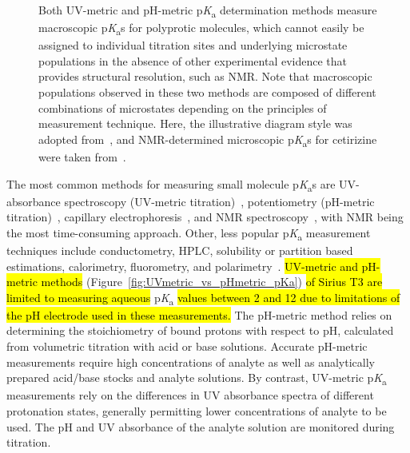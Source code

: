 \documentclass[9pt,lineno]{elife}
\newcommand{\pKa}{p\textit{K}\textsubscript{a}}
\begin{document}
\begin{figure}
\begin{center}
{Both UV-metric and pH-metric \pKa{} determination methods measure macroscopic \pKa{}s for polyprotic molecules, which cannot easily be assigned to individual titration sites and underlying microstate populations in the absence of other experimental evidence that provides structural resolution, such as NMR. 
Note that macroscopic populations observed in these two methods are composed of different combinations of microstates depending on the principles of measurement technique.
Here, the illustrative diagram style was adopted from~\citep{rupp_predicting_2011}, and NMR-determined microscopic \pKa{}s for cetirizine were taken from~\citep{marosi_triprotic_2009}. 
}
\label{fig:micro_vs_macro_pKa}
\end{center}
\end{figure}

The most common methods for measuring small molecule \pKa{}s are UV-absorbance spectroscopy (UV-metric titration)~\citep{tam_multi-wavelength_2001, allen_multiwavelength_1998,comer_ionization_2014}, potentiometry (pH-metric titration)~\citep{avdeef_ph-metric_1999,comer_ionization_2014}, capillary electrophoresis~\citep{cabot_novel_2015, wan_rapid_2002}, and NMR spectroscopy~\citep{bezencon_pka_2014}, with NMR being the most time-consuming approach. 
Other, less popular \pKa{} measurement techniques include conductometry, HPLC, solubility or partition based estimations, calorimetry, fluorometry, and polarimetry~\citep{reijenga_development_2013}. 
\hl{UV-metric and pH-metric methods} (Figure~\ref{fig:UVmetric_vs_pHmetric_pKa}) \hl{of Sirius T3 are limited to measuring aqueous} \pKa{} \hl{values between 2 and 12 due to limitations of the pH electrode used in these measurements.}
The pH-metric method relies on determining the stoichiometry of bound protons with respect to pH, calculated from volumetric titration with acid or base solutions. Accurate pH-metric measurements require high concentrations of analyte as well as analytically prepared acid/base stocks and analyte solutions. 
By contrast, UV-metric \pKa{} measurements rely on the differences in UV absorbance spectra of different protonation states, generally permitting lower concentrations of analyte to be used.
The pH and UV absorbance of the analyte solution are monitored during titration. 
\end{document}

